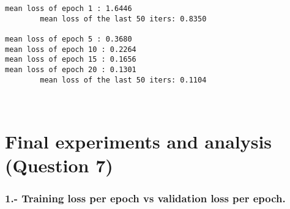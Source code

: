 \documentclass[11pt]{article}
\begin{document}
    \begin{Verbatim}[commandchars=\\\{\}]
mean loss of epoch 1 : 1.6446
        mean loss of the last 50 iters: 0.8350

mean loss of epoch 5 : 0.3680
mean loss of epoch 10 : 0.2264
mean loss of epoch 15 : 0.1656
mean loss of epoch 20 : 0.1301
        mean loss of the last 50 iters: 0.1104

    \end{Verbatim}

    \begin{center}
    \end{center}
    { \hspace*{\fill} \\}
    
    \hypertarget{final-experiments-and-analysis-question-7}{%
\section{Final experiments and analysis (Question
7)}\label{final-experiments-and-analysis-question-7}}

    \hypertarget{training-loss-per-epoch-vs-validation-loss-per-epoch.}{%
\subsubsection{1.- Training loss per epoch vs validation loss per
epoch.}\label{training-loss-per-epoch-vs-validation-loss-per-epoch.}}
\end{document}
